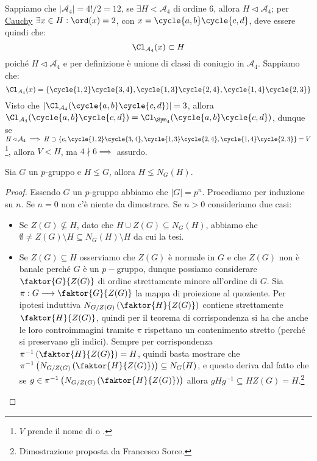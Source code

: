 \documentclass[11pt]{scrartcl}
\begin{document}
\begin{example}
    Sappiamo che $|\mathcal{A}_4| = 4!/2 = 12$, se $\exists H < \mathcal{A}_4$ di ordine $6$, allora $H \triangleleft \mathcal{A}_4$; per \hyperref[p:Cauchy]{Cauchy}
    $\exists x \in H : \ord(x) = 2$, con $x = \cycle{a,b}\cycle{c,d}$, deve essere quindi che:
        \[ \Cl_{\mathcal{A}_4}(x) \subset H
            \]
    poiché $H \triangleleft \mathcal{A}_4$ e per definizione è unione di classi di coniugio in $\mathcal{A}_4$. Sappiamo che:
        \[ \Cl_{\mathcal{A}_4}(x) = \{ \cycle{1,2}\cycle{3,4}, \cycle{1,3}\cycle{2,4}, \cycle{1,4}\cycle{2,3}\}
            \]
    Visto che $|\Cl_{\mathcal{A}_4}(\cycle{a,b} \cycle{c,d})| = 3$, allora $\Cl_{\mathcal{A}_4}(\cycle{a,b} \cycle{c,d}) = \Cl_{\Sym_4}(\cycle{a,b} \cycle{c,d})$,
    dunque se $H \triangleleft \mathcal{A}_4 \implies H \supset \{e, \cycle{1,2}\cycle{3,4}, \cycle{1,3}\cycle{2,4}, \cycle{1,4}\cycle{2,3}\} = V$ \footnote{$V$ prende il nome di  o .},
    allora $V < H$, ma $4 \nmid 6 \implies$ assurdo.
\end{example}

\begin{lemma}
    \label{l:1.95}
    Sia $G$ un $p$-gruppo e $H \lneq G$, allora $H \lneq N_G(H)$.
\end{lemma}

\begin{proof}
    Essendo $G$ un $p$-gruppo abbiamo che $|G|=p^n$. Procediamo per induzione su $n$. Se $n=0$ non c'è niente da dimostrare. Se $n>0$ consideriamo due casi: 
    \begin{itemize}
        \item Se $Z(G)\not\subseteq H$, dato che $H\cup Z(G)\subseteq N_G(H)$, abbiamo che $\emptyset\neq Z(G)\setminus H\subseteq N_G(H)\setminus H$ da cui la tesi.
        \item Se $Z(G)\subseteq H$ osserviamo che $Z(G)$ è normale in $G$ e che $Z(G)$ non è banale perché $G$ è un $p-$gruppo, dunque possiamo considerare $\faktor{G}{Z(G)}$
        di ordine strettamente minore all'ordine di $G$. Sia $\pi:G \longrightarrow \faktor{G}{Z(G)}$ la mappa di proiezione al quoziente. Per ipotesi induttiva $N_{G/Z(G)}\left(\faktor{H}{Z(G)}\right)$ contiene strettamente $\faktor{H}{Z(G)}$, quindi per il teorema di corrispondenza si ha che anche
        le loro controimmagini tramite $\pi$ rispettano un contenimento stretto (perché si preservano gli indici). Sempre per corrispondenza $\pi^{-1}\left(\faktor{H}{Z(G)}\right)=H$, quindi basta mostrare che $\pi^{-1}\left(N_{G/Z(G)}\left(\faktor{H}{Z(G)}\right)\right)\subseteq N_G(H)$, e questo deriva 
        dal fatto che se $g\in \pi^{-1}\left(N_{G/Z(G)}\left(\faktor{H}{Z(G)}\right)\right)$ allora $gHg^{-1}\subseteq HZ(G)=H$.\footnote{Dimostrazione proposta da Francesco Sorce.}
    \end{itemize}
\end{proof}
\end{document}
